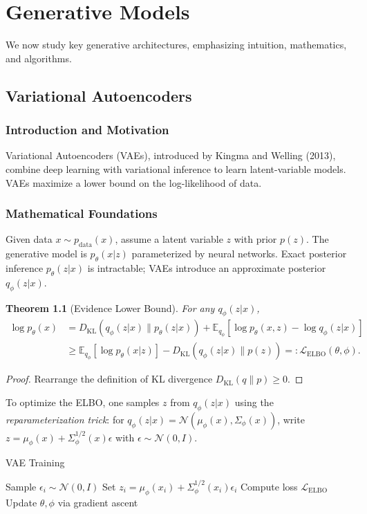 \documentclass[11pt]{book}
\newtheorem{theorem}{Theorem}[chapter]
\begin{document}
\chapter{Generative Models}
We now study key generative architectures, emphasizing intuition, mathematics, and algorithms.

\section{Variational Autoencoders}
\subsection{Introduction and Motivation}
Variational Autoencoders (VAEs), introduced by Kingma and Welling (2013), combine deep learning with variational inference to learn latent-variable models. VAEs maximize a lower bound on the log-likelihood of data.

\subsection{Mathematical Foundations}
Given data $x\sim p_\text{data}(x)$, assume a latent variable $z$ with prior $p(z)$. The generative model is $p_\theta(x|z)$ parameterized by neural networks. Exact posterior inference $p_\theta(z|x)$ is intractable; VAEs introduce an approximate posterior $q_\phi(z|x)$.

\begin{theorem}[Evidence Lower Bound]
For any $q_\phi(z|x)$,
\begin{align}
\log p_\theta(x) &= D_{\mathrm{KL}}(q_\phi(z|x)\|p_\theta(z|x)) + \mathbb{E}_{q_\phi} [\log p_\theta(x,z) - \log q_\phi(z|x)] \\
&\ge \mathbb{E}_{q_\phi} [\log p_\theta(x|z)] - D_{\mathrm{KL}}(q_\phi(z|x)\|p(z)) =: \mathcal{L}_{\text{ELBO}}(\theta,\phi).
\end{align}
\end{theorem}
\begin{proof}
Rearrange the definition of KL divergence $D_{\mathrm{KL}}(q\|p)\ge0$.
\end{proof}

To optimize the ELBO, one samples $z$ from $q_\phi(z|x)$ using the \emph{reparameterization trick}: for $q_\phi(z|x)=\mathcal{N}(\mu_\phi(x),\Sigma_\phi(x))$, write $z=\mu_\phi(x)+\Sigma_\phi^{1/2}(x)\epsilon$ with $\epsilon\sim\mathcal{N}(0,I)$.

\begin{algorithm}
\caption{VAE Training}
\begin{algorithmic}[1]
    \STATE Sample $\epsilon_i\sim\mathcal{N}(0,I)$
    \STATE Set $z_i=\mu_\phi(x_i)+\Sigma_\phi^{1/2}(x_i)\epsilon_i$
    \STATE Compute loss $\mathcal{L}_{\text{ELBO}}$
    \STATE Update $\theta,\phi$ via gradient ascent
\ENDFOR
\end{algorithmic}
\end{algorithm}
\end{document}
